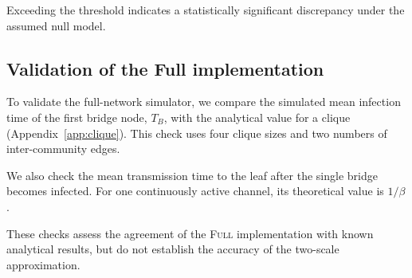 \documentclass[a4paper,fleqn]{cas-sc}
\newcommand{\Full}{\textup{\textsc{Full}}}
\begin{document}
Exceeding the threshold indicates a statistically significant discrepancy under the assumed null model.

\subsection{Validation of the Full implementation}

To validate the full-network simulator, we compare the simulated mean infection time of the first bridge node, $T_B$, with the analytical value for a clique (Appendix~\ref*{app:clique}). This check uses four clique sizes and two numbers of inter-community edges.

We also check the mean transmission time to the leaf after the single bridge becomes infected. For one continuously active channel, its theoretical value is $1/\beta$.

These checks assess the agreement of the \Full{} implementation with known analytical results, but do not establish the accuracy of the two-scale approximation.




\end{document}
